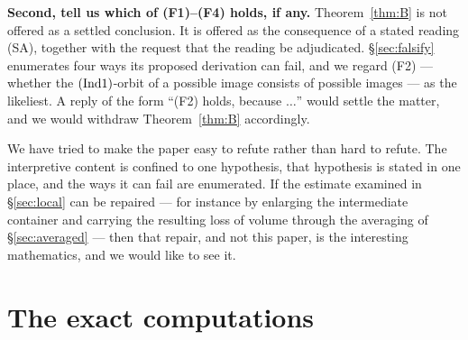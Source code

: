 \documentclass[11pt]{article}
\theoremstyle{plain}
\theoremstyle{definition}
\newcommand{\Ind}[1]{\textup{(Ind#1)}}
\newcommand{\SA}{\textup{(SA)}}
\begin{document}
\medskip\noindent\textbf{Second, tell us which of (F1)--(F4) holds, if any.}
Theorem~\ref{thm:B} is not offered as a settled conclusion.  It is offered as the
consequence of a stated reading \SA{}, together with the request that the reading
be adjudicated.  \S\ref{sec:falsify} enumerates four ways its proposed derivation can fail, and
we regard (F2) --- whether the $\Ind1$-orbit of a possible image consists of
possible images --- as the likeliest.  A reply of the form ``(F2) holds, because
$\ldots$'' would settle the matter, and we would withdraw Theorem~\ref{thm:B}
accordingly.

\medskip\noindent
We have tried to make the paper easy to refute rather than hard to refute.  The
interpretive content is confined to one hypothesis, that hypothesis is stated in
one place, and the ways it can fail are enumerated.  If the estimate examined in
\S\ref{sec:local} can be repaired --- for instance by enlarging the intermediate
container and carrying the resulting loss of volume through the averaging of
\S\ref{sec:averaged} --- then that repair, and not this paper, is the interesting
mathematics, and we would like to see it.

\appendix

\section{The exact computations}\label{app:comp}
\end{document}
